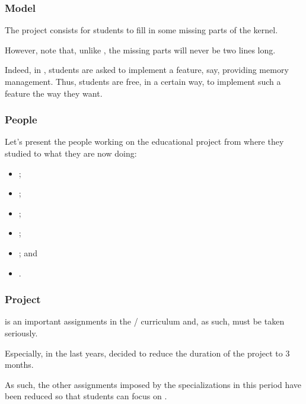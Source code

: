 
\begin{frame}
  \frametitle{Model}

  The project consists for students to fill in some missing parts of the
  kernel.

  \-

  However, note that, unlike , the missing parts will never
  be two lines long.

  \-

  Indeed, in , students are asked to implement a feature, say,
  providing memory management. Thus, students are free, in a certain way,
  to implement such a feature the way they want.
\end{frame}


\begin{frame}
  \frametitle{People}

  Let's present the people working on the educational project from where they
  studied to what they are now doing:

  \begin{itemize}
    \item
      ;
    \item
      ;
    \item
      ;
    \item
      ;
    \item
      ; and
    \item
      .
  \end{itemize}
\end{frame}


\begin{frame}
  \frametitle{Project}

   is an important assignments in the /
  curriculum and, as such, must be taken seriously.

  \-

  Especially, in the last years,  decided to reduce the duration
  of the project to $3$ months.

  \-

  As such, the other assignments imposed by the specializations in this
  period have been reduced so that students can focus on .
\end{frame}

